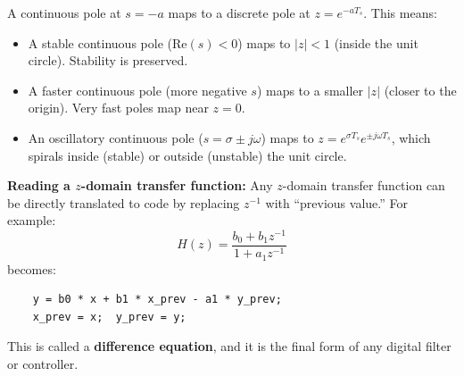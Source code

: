 A continuous pole at $s = -a$ maps to a discrete pole at $z = e^{-aT_s}$. This means:
\begin{itemize}
    \item A stable continuous pole ($\text{Re}(s) < 0$) maps to $|z| < 1$ (inside the unit circle). Stability is preserved.
    \item A faster continuous pole (more negative $s$) maps to a smaller $|z|$ (closer to the origin). Very fast poles map near $z = 0$.
    \item An oscillatory continuous pole ($s = \sigma \pm j\omega$) maps to $z = e^{\sigma T_s} e^{\pm j\omega T_s}$, which spirals inside (stable) or outside (unstable) the unit circle.
\end{itemize}

\textbf{Reading a $z$-domain transfer function:} Any $z$-domain transfer function can be directly translated to code by replacing $z^{-1}$ with ``previous value.'' For example:
\[
H(z) = \frac{b_0 + b_1 z^{-1}}{1 + a_1 z^{-1}}
\]
becomes:
\begin{verbatim}
    y = b0 * x + b1 * x_prev - a1 * y_prev;
    x_prev = x;  y_prev = y;
\end{verbatim}
This is called a \textbf{difference equation}, and it is the final form of any digital filter or controller.
